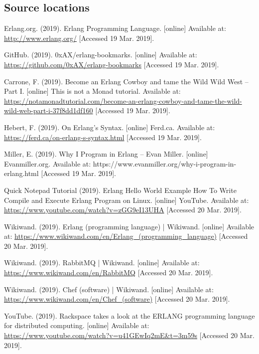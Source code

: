 \documentclass[11 pt]{IEEEtran}
\begin{document}
 \subsection{Source locations}

  
\begin{thebibliography}{99}
Erlang.org. (2019). Erlang Programming Language. [online] Available at: \url{http://www.erlang.org/} [Accessed 19 Mar. 2019].

GitHub. (2019). 0xAX/erlang-bookmarks. [online] Available at: \url{https://github.com/0xAX/erlang-bookmarks} [Accessed 19 Mar. 2019].

Carrone, F. (2019). Become an Erlang Cowboy and tame the Wild Wild West -- Part I. [online] This is not a Monad tutorial. Available at: \url{https://notamonadtutorial.com/become-an-erlang-cowboy-and-tame-the-wild-wild-web-part-i-37f8dd1df160} [Accessed 19 Mar. 2019].

Hebert, F. (2019). On Erlang's Syntax. [online] Ferd.ca. Available at: \url{https://ferd.ca/on-erlang-s-syntax.html} [Accessed 19 Mar. 2019].

Miller, E. (2019). Why I Program in Erlang – Evan Miller. [online] Evanmiller.org. Available at: https://www.evanmiller.org/why-i-program-in-erlang.html [Accessed 19 Mar. 2019].

Quick Notepad Tutorial (2019). Erlang Hello World Example How To Write Compile and Execute Erlang Program on Linux. [online] YouTube. Available at: \url{https://www.youtube.com/watch?v=zGG9eI13UHA} [Accessed 20 Mar. 2019].

Wikiwand. (2019). Erlang (programming language) | Wikiwand. [online] Available at: \url{https://www.wikiwand.com/en/Erlang_(programming_language)} [Accessed 20 Mar. 2019].

Wikiwand. (2019). RabbitMQ | Wikiwand. [online] Available at: \url{https://www.wikiwand.com/en/RabbitMQ} [Accessed 20 Mar. 2019].

Wikiwand. (2019). Chef (software) | Wikiwand. [online] Available at: \url{https://www.wikiwand.com/en/Chef_(software)} [Accessed 20 Mar. 2019].

YouTube. (2019). Rackspace takes a look at the ERLANG programming language for distributed computing. [online] Available at: \url{https://www.youtube.com/watch?v=u41GEwIq2mE&t=3m59s} [Accessed 20 Mar. 2019].


\end{thebibliography}
\end{document}
